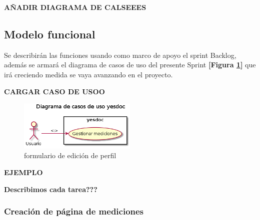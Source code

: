 \documentclass[a4paper,12pt]{article}
\begin{document}
\textbf{AÑADIR DIAGRAMA DE CALSEEES}


\subsection{Modelo funcional} %
Se describirán las funciones usando como marco de apoyo el sprint Backlog, además se armará el diagrama de casos de uso del presente Sprint \textbf{[Figura \ref{2-caso_de_uso}]} que irá creciendo  medida se vaya avanzando en el proyecto.


\textbf{CARGAR CASO DE USOO}
    \begin{figure}[h]
        \centering
        \includegraphics[width=0.5\textwidth]{img/2-caso_de_uso}
        \caption{formulario de edición de perfil}
		\label{2-caso_de_uso}
    \end{figure}


\textbf{EJEMPLO}
	{\scriptsize
	\begin{center} %
	\centering
    	\end{center}
	}
    
    \textbf{Describimos cada tarea???}
\subsubsection{Creación de página de mediciones}
\end{document}

